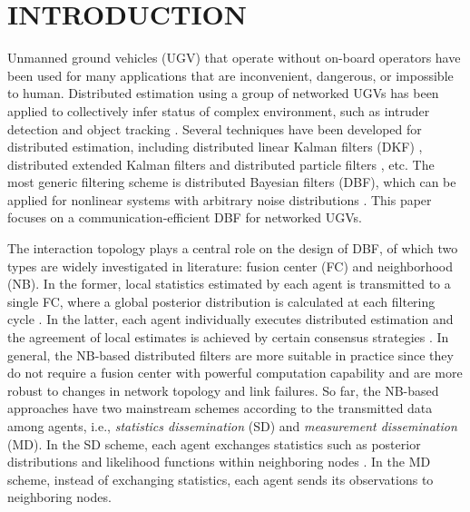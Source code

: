 \section{INTRODUCTION}
	
	Unmanned ground vehicles (UGV) that operate without on-board operators have been used for many applications that are inconvenient, dangerous, or impossible to human. Distributed estimation using a group of networked UGVs has been applied to collectively infer status of complex environment, such as intruder detection \cite{chamberland2007wireless} and object tracking \cite{wang2003online}. Several techniques have been developed for distributed estimation, including distributed linear Kalman filters (DKF) \cite{2005distributed}, distributed extended Kalman filters \cite{madhavan2004distributed} and distributed particle filters \cite{gu2007distributed}, etc. The most generic filtering scheme is distributed Bayesian filters (DBF), which can be applied for nonlinear systems with arbitrary noise distributions \cite{bandyopadhyay2014distributed,julian2012distributed}.
	This paper focuses on a communication-efficient DBF for networked UGVs.
	
	The interaction topology plays a central role on the design of DBF, of which two types are widely investigated in literature: fusion center (FC) and neighborhood (NB). In the former, local statistics estimated by each agent is transmitted to a single FC, where a global posterior distribution is calculated at each filtering cycle \cite{zuo2006bandwidth,vemula2006target}. In the latter, each agent individually executes distributed estimation and the agreement of local estimates is achieved by certain consensus strategies \cite{jadbabaie2003coordination,ren2005consensus,olfati2007consensus}. In general, the NB-based distributed filters are more suitable in practice since they do not require a fusion center with powerful computation capability and are more robust to changes in network topology and link failures. So far, the NB-based approaches have two mainstream schemes according to the transmitted data among agents, i.e., \textit{statistics dissemination} (SD) and \textit{measurement dissemination} (MD). In the SD scheme, each agent exchanges statistics such as posterior distributions and likelihood functions within neighboring nodes \cite{hlinka2013distributed}. In the MD scheme, instead of exchanging statistics, each agent sends its observations to neighboring nodes. 
	
